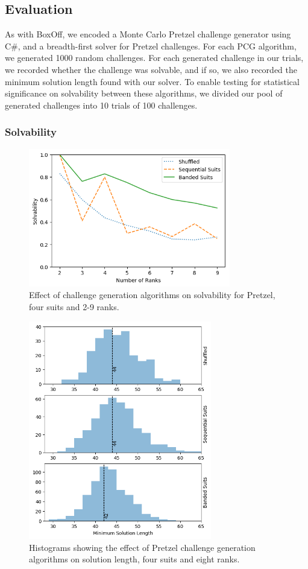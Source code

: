 \documentclass[journal]{IEEEtran}
\begin{document}
\subsection{Evaluation}
\noindent
As with BoxOff, we encoded a Monte Carlo Pretzel challenge generator using C\#, and a breadth-first solver for Pretzel challenges. For each PCG algorithm, we generated 1000 random challenges. For each generated challenge in our trials, we recorded whether the challenge was solvable, and if so, we also recorded the minimum solution length found with our solver. To enable testing for statistical significance on solvability between these algorithms, we divided our pool of generated challenges into 10 trials of 100 challenges. 

\subsubsection{Solvability}

\begin{figure}[t]
\includegraphics[width=8.8cm]{pretzelfulln.png}
\caption{Effect of challenge generation algorithms on solvability for Pretzel, four suits and 2-9 ranks.}
\label{fig:pretzelfullsolve}
\end{figure}

\begin{figure}[t]
\centering
\includegraphics[width=8cm]{pretzel48length.png}
\caption{Histograms showing the effect of Pretzel challenge generation algorithms on solution length, four suits and eight ranks.}
\label{fig:pretzellength}
\end{figure}
\end{document}
